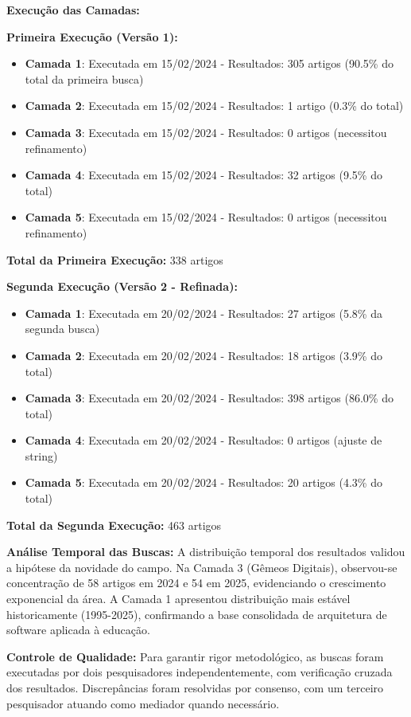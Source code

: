 \documentclass[english, spanish, brazilian]{RBIEarticle} %
\begin{document}
\textbf{Execução das Camadas:}

\textbf{Primeira Execução (Versão 1):}
\begin{itemize}
\item \textbf{Camada 1}: Executada em 15/02/2024 - Resultados: 305 artigos (90.5\% do total da primeira busca)
\item \textbf{Camada 2}: Executada em 15/02/2024 - Resultados: 1 artigo (0.3\% do total)
\item \textbf{Camada 3}: Executada em 15/02/2024 - Resultados: 0 artigos (necessitou refinamento)
\item \textbf{Camada 4}: Executada em 15/02/2024 - Resultados: 32 artigos (9.5\% do total)
\item \textbf{Camada 5}: Executada em 15/02/2024 - Resultados: 0 artigos (necessitou refinamento)
\end{itemize}

\textbf{Total da Primeira Execução:} 338 artigos

\textbf{Segunda Execução (Versão 2 - Refinada):}
\begin{itemize}
\item \textbf{Camada 1}: Executada em 20/02/2024 - Resultados: 27 artigos (5.8\% da segunda busca)
\item \textbf{Camada 2}: Executada em 20/02/2024 - Resultados: 18 artigos (3.9\% do total)
\item \textbf{Camada 3}: Executada em 20/02/2024 - Resultados: 398 artigos (86.0\% do total)
\item \textbf{Camada 4}: Executada em 20/02/2024 - Resultados: 0 artigos (ajuste de string)
\item \textbf{Camada 5}: Executada em 20/02/2024 - Resultados: 20 artigos (4.3\% do total)
\end{itemize}

\textbf{Total da Segunda Execução:} 463 artigos

\textbf{Análise Temporal das Buscas:}
A distribuição temporal dos resultados validou a hipótese da novidade do campo. Na Camada 3 (Gêmeos Digitais), observou-se concentração de 58 artigos em 2024 e 54 em 2025, evidenciando o crescimento exponencial da área. A Camada 1 apresentou distribuição mais estável historicamente (1995-2025), confirmando a base consolidada de arquitetura de software aplicada à educação.

\textbf{Controle de Qualidade:} Para garantir rigor metodológico, as buscas foram executadas por dois pesquisadores independentemente, com verificação cruzada dos resultados. Discrepâncias foram resolvidas por consenso, com um terceiro pesquisador atuando como mediador quando necessário.
\end{document}
